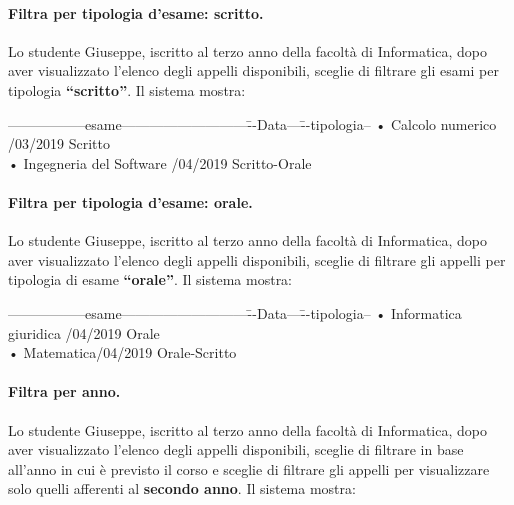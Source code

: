 \paragraph{Filtra per tipologia d’esame: scritto.}
Lo studente Giuseppe, iscritto al terzo anno della facoltà di Informatica, dopo aver visualizzato l’elenco degli appelli disponibili, sceglie di filtrare gli esami per tipologia \textbf{“scritto”}. Il sistema mostra:  

 \begin{tabbing}
	\hspace{1cm}-----------------esame---------------------------\=--Data---\= --tipologia--\kill
	\hspace{1cm} • Calcolo numerico  /03/2019 \> \hspace{1cm}Scritto \\
	\hspace{1cm} • Ingegneria del Software /04/2019 \> \hspace{1cm}Scritto-Orale  \\
\end{tabbing}

\paragraph{Filtra per tipologia d’esame: orale.}
Lo studente Giuseppe, iscritto al terzo anno della facoltà di Informatica, dopo aver visualizzato l’elenco degli appelli disponibili, sceglie di filtrare gli appelli per tipologia di esame \textbf{“orale”}. Il sistema mostra:

 \begin{tabbing}
	\hspace{1cm}-----------------esame---------------------------\=--Data---\= --tipologia--\kill
	\hspace{1cm} • Informatica giuridica  /04/2019\> \hspace{1cm}Orale \\
	\hspace{1cm} • Matematica/04/2019 \> \hspace{1cm}Orale-Scritto  \\
\end{tabbing}

\paragraph{Filtra per anno.}
Lo studente Giuseppe, iscritto al terzo anno della facoltà di Informatica, dopo aver visualizzato l’elenco degli appelli disponibili, sceglie di filtrare in base all'anno in cui è previsto il corso e sceglie di filtrare gli appelli per visualizzare solo quelli afferenti al \textbf{secondo anno}. Il sistema mostra:

